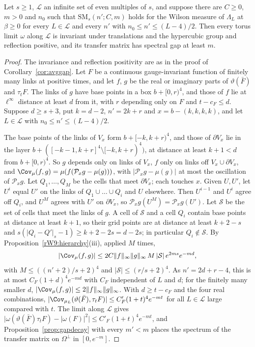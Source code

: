 \begin{theorem}\label{rW9:allscales}
Let $s\ge1$, $\mathcal L$ an infinite set of even multiples of $s$, and
suppose there are $C\ge0$, $m>0$ and $n_0$ such that $\mathrm{SM}_s(n';C,m)$
holds for the Wilson measure of $\Lambda_L$ at $\beta\ge0$ for every $L\in
\mathcal L$ and every $n'$ with $n_0\le n'\le(L-4)/2$. Then every torus limit
$\omega$ along $\mathcal L$ is invariant under translations and the
hypercubic group and reflection positive, and its transfer matrix has
spectral gap at least $m$.
\end{theorem}

\begin{proof}
The invariance and reflection positivity are as in the proof of
Corollary~\ref{cor:avggap}. Let $F$ be a continuous gauge-invariant function
of finitely many links at positive times, and let $f$, $g$ be the real or
imaginary parts of $\vartheta(\bar F)$ and $\tau_tF$. The links of $g$ have
base points in a box $b+[0,r)^4$, and those of $f$ lie at $\ell^\infty$
distance at least $d$ from it, with $r$ depending only on $F$ and $t-c_F\le d$.
Suppose $d\ge s+3$, put $k=d-2$, $n'=2k+r$ and $x=b-(k,k,k,k)$, and let $L\in
\mathcal L$ with $n_0\le n'\le(L-4)/2$.

The base points of the links of $V_x$ form $b+[-k,k+r)^4$, and those of
$\partial V_x$ lie in the layer $b+([-k-1,k+r]^4\setminus[-k,k+r)^4)$, at
distance at least $k+1<d$ from $b+[0,r)^4$. So $g$ depends only on links of
$V_x$, $f$ only on links off $V_x\cup\partial V_x$, and $\Cov_\mu(f,g)=\mu(f
(\mathcal P_xg-\mu(g)))$, with $\lvert\mathcal P_xg-\mu(g)\rvert$ at most the
oscillation of $\mathcal P_xg$. Let $Q_1,\dots,Q_M$ be the cells that meet
$\partial V_x$; each touches $x$. Given $U,U'$, let $U^i$ equal $U'$ on the
links of $Q_1\cup\dots\cup Q_i$ and $U$ elsewhere. Then $U^{i-1}$ and $U^i$
agree off $Q_i$, and $U^M$ agrees with $U'$ on $\partial V_x$, so $\mathcal
P_xg(U^M)=\mathcal P_xg(U')$. Let $\mathcal S$ be the set of cells that meet
the links of $g$. A cell of $\mathcal S$ and a cell $Q_i$ contain base points
at distance at least $k+1$, so their grid points are at distance at least
$k+2-s$ and $s(\lvert Q_i-Q'\rvert_s-1)\ge k+2-2s=d-2s$; in particular $Q_i
\notin\mathcal S$. By Proposition~\ref{rW9:hierarchy}(iii), applied $M$
times,
\[
\lvert\Cov_\mu(f,g)\rvert\le2C\lVert f\rVert_\infty\lVert g\rVert_\infty\,
M\,\lvert\mathcal S\rvert\,e^{2ms}e^{-md},
\]
with $M\le((n'+2)/s+2)^4$ and $\lvert\mathcal S\rvert\le(r/s+2)^4$. As
$n'=2d+r-4$, this is at most $C_F(1+d)^4e^{-md}$ with $C_F$ independent of $L$
and $d$; for the finitely many smaller $d$, $\lvert\Cov_\mu(f,g)\rvert\le2\lVert
f\rVert_\infty\lVert g\rVert_\infty$. With $d\ge t-c_F$ and the four real
combinations, $\lvert\Cov_{\mu_L}(\vartheta(\bar F),\tau_tF)\rvert\le C'_F
(1+t)^4e^{-mt}$ for all $L\in\mathcal L$ large compared with $t$. The limit
along $\mathcal L$ gives $\lvert\omega(\vartheta(\bar F)\tau_tF)-\lvert
\omega(F)\rvert^2\rvert\le C'_F(1+t)^4e^{-mt}$, and
Proposition~\ref{prop:gapdecay} with every $m'<m$ places the spectrum of the
transfer matrix on $\Omega^\perp$ in $[0,e^{-m}]$.
\end{proof}

